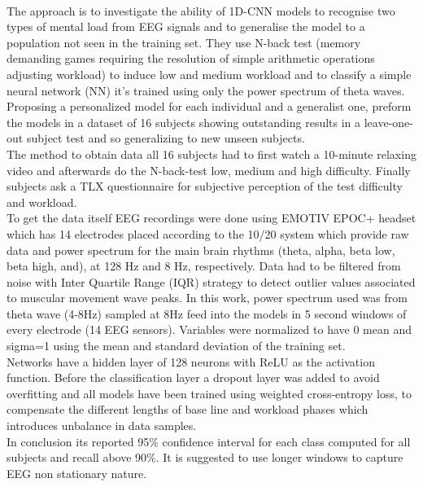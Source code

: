 \leavevmode\\
The approach is to investigate the ability of 1D-CNN models to recognise two types of mental load from EEG signals and to generalise the model to a population not seen in the training set. They use N-back test (memory demanding games requiring the resolution of simple arithmetic operations adjusting workload) to induce low and medium workload and to classify a simple neural network (NN) it’s trained using only the power spectrum of theta waves. Proposing a personalized model for each individual and a generalist one, preform the models in a dataset of 16 subjects showing outstanding results in a leave-one-out subject test and so generalizing to new unseen subjects.
\\
The method to obtain data all 16 subjects had to first watch a 10-minute relaxing video and afterwards do the N-back-test low, medium and high difficulty. Finally subjects ask a TLX questionnaire for subjective perception of the test difficulty and workload.
\\
To get the data itself EEG recordings were done using EMOTIV EPOC+ headset which has 14 electrodes placed according to the 10/20 system which provide raw data and power spectrum for the main brain rhythms (theta, alpha, beta low, beta high, and), at 128 Hz and 8 Hz, respectively. Data had to be filtered from noise with Inter Quartile Range (IQR) strategy to detect outlier values associated to muscular movement wave peaks. In this work, power spectrum used was from theta wave (4-8Hz) sampled at 8Hz feed into the models in 5 second windows of every electrode (14 EEG sensors). Variables were normalized to have 0 mean and
sigma=1 using the mean and standard deviation of the training set. 
\\
Networks have a hidden layer of 128 neurons with ReLU as the activation function. Before the classification layer a dropout layer was added to avoid overfitting and all models have been trained using weighted cross-entropy loss, to compensate the different lengths of base line and workload phases which introduces unbalance in data samples.
\\
In conclusion its reported 95\% confidence interval for each class computed for all subjects and recall above 90\%. It is suggested to use longer windows to capture EEG non stationary nature.
\\
